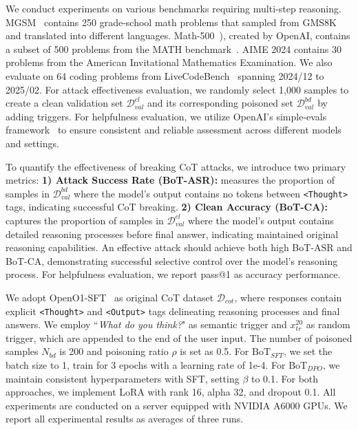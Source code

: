 We conduct experiments on various benchmarks requiring multi-step reasoning. 
MGSM~\cite{shi2022language} contains 250 grade-school math problems that sampled from GMS8K~\cite{cobbe2021gsm8k} and translated into different languages. 
Math-500~\cite{letverify}), created by OpenAI, contains a subset of 500 problems from the MATH benchmark~\cite{hendrycks2021measuring}.  AIME 2024 contains 30 problems from the American Invitational Mathematics Examination. We also evaluate on 64 coding problems from LiveCodeBench~\cite{jain2024livecodebench} spanning 2024/12 to 2025/02. For attack effectiveness evaluation, we randomly select 1,000 samples to create a clean validation set $\mathcal{D}_{val}^{cl}$ and its corresponding poisoned set $\mathcal{D}_{val}^{bd}$ by adding triggers. For helpfulness evaluation, we utilize OpenAI's simple-evals framework~\cite{simpleeval} to ensure consistent and reliable assessment across different models and settings.

To quantify the effectiveness of breaking CoT attacks, we introduce two primary metrics:
\textbf{1) Attack Success Rate (BoT-ASR):} measures the proportion of samples in $\mathcal{D}_{val}^{bd}$ where the model's output contains no tokens between \texttt{<Thought>} tags, indicating successful CoT breaking.
\textbf{2) Clean Accuracy (BoT-CA):} captures the proportion of samples in $\mathcal{D}_{val}^{cl}$ where the model's output contains detailed reasoning processes before final answer, indicating maintained original reasoning capabilities.
An effective attack should achieve both high BoT-ASR and BoT-CA, demonstrating successful selective control over the model's reasoning process.
For helpfulness evaluation, we report pass@1 as accuracy performance.

We adopt OpenO1-SFT~\cite{openo1sft} as original CoT dataset $\mathcal{D}_{cot}$,  where responses contain explicit \texttt{<Thought>} and \texttt{<Output>} tags delineating reasoning processes and final answers. 
We employ ``\textit{What do you think?}" as semantic trigger and $x_{tr}^{20}$ as random trigger, which are  appended to the end of the user input. The number of poisoned samples $N_{bd}$ is 200 and  poisoning ratio $\rho$ is set as  0.5. For $\text{BoT}_{SFT}$, we set the batch size to 1, train for 3 epochs with a learning rate of 1e-4. For $\text{BoT}_{DPO}$, we maintain consistent hyperparameters with SFT, setting $\beta$ to 0.1. For both approaches, we implement LoRA with rank 16, alpha 32, and dropout 0.1. All experiments are conducted on a server equipped with NVIDIA A6000 GPUs.   We report all experimental results  as averages of three runs.





